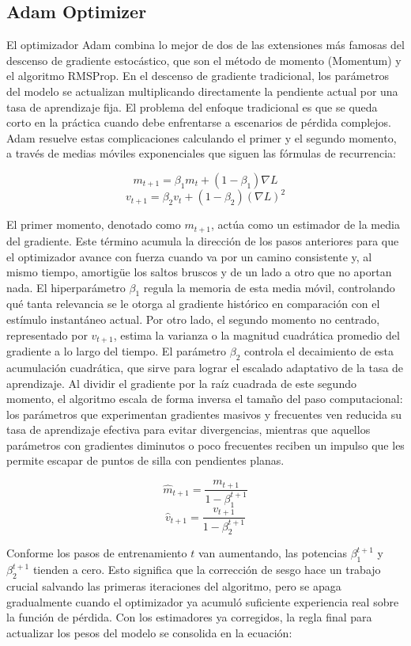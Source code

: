 \documentclass[12pt]{article}
\begin{document}
\subsection{Adam Optimizer}

El optimizador Adam combina lo mejor de dos de las extensiones más famosas del descenso 
de gradiente estocástico, que son el método de momento (Momentum) y el algoritmo RMSProp. 
En el descenso de gradiente tradicional, los parámetros del modelo se actualizan multiplicando 
directamente la pendiente actual por una tasa de aprendizaje fija. El problema del enfoque 
tradicional es que se queda corto en la práctica cuando debe enfrentarse a escenarios de pérdida 
complejos. Adam resuelve estas complicaciones calculando el primer y el segundo momento, a 
través de medias móviles exponenciales que siguen las fórmulas de recurrencia:

$$m_{t+1} = \beta_1 m_t + (1 - \beta_1) \nabla L$$$$v_{t+1} = \beta_2 v_t + (1 - \beta_2) (\nabla L)^2$$

El primer momento, denotado como $m_{t+1}$, actúa como un estimador de la media del gradiente. 
Este término acumula la dirección de los pasos anteriores para que el optimizador avance con 
fuerza cuando va por un camino consistente y, al mismo tiempo, amortigüe los saltos bruscos 
y de un lado a otro que no aportan nada. El hiperparámetro $\beta_1$ regula la memoria de 
esta media móvil, controlando qué tanta relevancia se le otorga al gradiente histórico en 
comparación con el estímulo instantáneo actual. Por otro lado, el segundo momento no centrado, 
representado por $v_{t+1}$, estima la varianza o la magnitud cuadrática promedio del gradiente a 
lo largo del tiempo. El parámetro $\beta_2$ controla el decaimiento de esta acumulación 
cuadrática, que sirve para lograr el escalado adaptativo de la tasa de aprendizaje. 
Al dividir el gradiente por la raíz cuadrada de este segundo momento, el algoritmo escala 
de forma inversa el tamaño del paso computacional: los parámetros que experimentan gradientes 
masivos y frecuentes ven reducida su tasa de aprendizaje efectiva para evitar divergencias, 
mientras que aquellos parámetros con gradientes diminutos o poco frecuentes reciben un impulso 
que les permite escapar de puntos de silla con pendientes planas.

$$\hat{m}_{t+1} = \frac{m_{t+1}}{1 - \beta_1^{t+1}}$$$$\hat{v}_{t+1} = \frac{v_{t+1}}{1 - \beta_2^{t+1}}$$

Conforme los pasos de entrenamiento $t$ van aumentando, las potencias $\beta_1^{t+1}$ 
y $\beta_2^{t+1}$ tienden a cero. Esto significa que la corrección de sesgo hace un trabajo 
crucial salvando las primeras iteraciones del algoritmo, pero se apaga gradualmente cuando el 
optimizador ya acumuló suficiente experiencia real sobre la función de pérdida. Con los 
estimadores ya corregidos, la regla final para actualizar los pesos del modelo se consolida 
en la ecuación:
\end{document}
